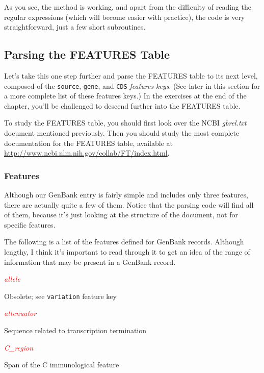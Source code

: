 As you see, the method is working, and apart from the difficulty of reading the regular expressions (which will become easier with practice), the code is very straightforward, just a few short subroutines.

\subsection{Parsing the FEATURES Table}
Let's take this one step further and parse the FEATURES table to its next level, composed of the \verb|source|, \verb|gene|, and \verb|CDS| \textit{features keys}. (See later in this section for a more complete list of these features keys.) In the exercises at the end of the chapter, you'll be challenged to descend further into the FEATURES table.

To study the FEATURES table, you should first look over the NCBI \textit{gbrel.txt} document mentioned previously. Then you should study the most complete documentation for the FEATURES table, available at \href{http://www.ncbi.nlm.nih.gov/collab/FT/index.html}{http://www.ncbi.nlm.nih.gov/collab/FT/index.html}.

\subsubsection{Features}
Although our GenBank entry is fairly simple and includes only three features, there are actually quite a few of them. Notice that the parsing code will find all of them, because it's just looking at the structure of the document, not for specific features.

The following is a list of the features defined for GenBank records. Although lengthy, I think it's important to read through it to get an idea of the range of information that may be present in a GenBank record.

\textcolor{red}{\textit{allele}}
\begin{adjustwidth}{2em}{}
Obsolete; see \verb|variation| feature key
\end{adjustwidth}

\textcolor{red}{\textit{attenuator}}
\begin{adjustwidth}{2em}{}
Sequence related to transcription termination
\end{adjustwidth}

\textcolor{red}{\textit{C\_region}}
\begin{adjustwidth}{2em}{}
Span of the C immunological feature
\end{adjustwidth}

